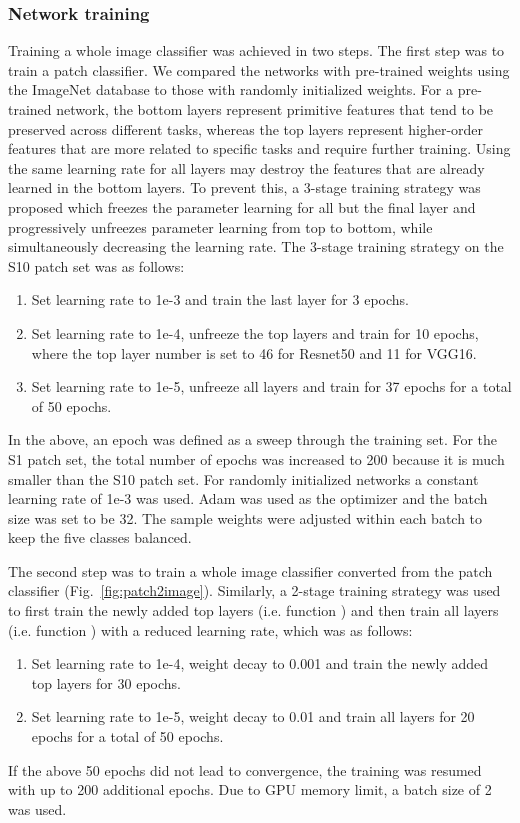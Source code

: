 \documentclass[12pt,letterpaper]{article}
\begin{document}
\subsubsection{Network training}
Training a whole image classifier was achieved in two steps. The first step was to train a patch classifier. We compared the networks with pre-trained weights using the ImageNet \cite{russakovsky_imagenet_2015} database to those with randomly initialized weights. For a pre-trained network, the bottom layers represent primitive features that tend to be preserved across different tasks, whereas the top layers represent higher-order features that are more related to specific tasks and require further training. Using the same learning rate for all layers may destroy the features that are already learned in the bottom layers. To prevent this, a 3-stage training strategy was proposed which freezes the parameter learning for all but the final layer and progressively unfreezes parameter learning from top to bottom, while simultaneously decreasing the learning rate. The 3-stage training strategy on the S10 patch set was as follows:
\begin{enumerate}
  \item Set learning rate to 1e-3 and train the last layer for 3 epochs.
  \item Set learning rate to 1e-4, unfreeze the top layers and train for 10 epochs, where the top layer number is set to 46 for Resnet50 and 11 for VGG16.
  \item Set learning rate to 1e-5, unfreeze all layers and train for 37 epochs for a total of 50 epochs.
\end{enumerate}
In the above, an epoch was defined as a sweep through the training set. For the S1 patch set, the total number of epochs was increased to 200 because it is much smaller than the S10 patch set. For randomly initialized networks a constant learning rate of 1e-3 was used. Adam \cite{kingma_adam_2014} was used as the optimizer and the batch size was set to be 32. The sample weights were adjusted within each batch to keep the five classes balanced.

The second step was to train a whole image classifier converted from the patch classifier (Fig.~\ref{fig:patch2image}). Similarly, a 2-stage training strategy was used to first train the newly added top layers (i.e. function ) and then train all layers (i.e. function ) with a reduced learning rate, which was as follows:
\begin{enumerate}
  \item Set learning rate to 1e-4, weight decay to 0.001 and train the newly added top layers for 30 epochs. 
  \item Set learning rate to 1e-5, weight decay to 0.01 and train all layers for 20 epochs for a total of 50 epochs.
\end{enumerate}
If the above 50 epochs did not lead to convergence, the training was resumed with up to 200 additional epochs. Due to GPU memory limit, a batch size of 2 was used.
\end{document}

